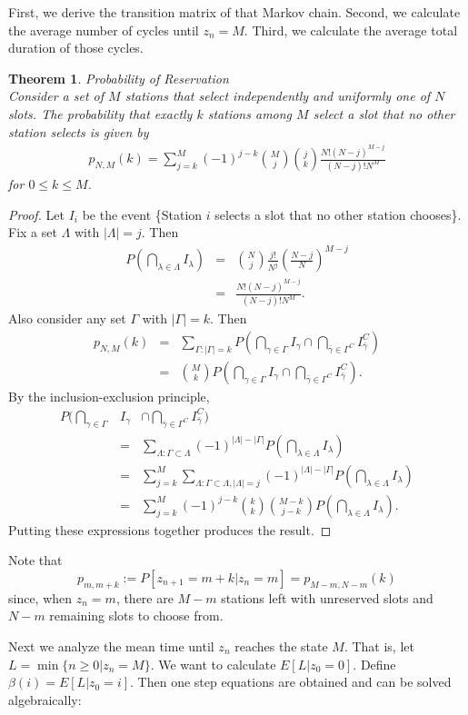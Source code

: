 \documentclass{acm_proc_article-sp}
\newtheorem{theorem}{Theorem}
\newcommand{\be}{\begin{eqnarray}}
\newcommand{\ee}{\end{eqnarray}}
\newcommand{\sub}{}
\begin{document}
First, we derive the transition matrix of that Markov chain. Second, we calculate the average number of cycles until $z_n = M$. Third, we calculate the average total duration of those cycles.

\begin{theorem}{Probability of Reservation}\\
Consider a set of $M$ stations that select independently and uniformly one of $N$ slots.  The probability that exactly $k$ stations among $M$ select a slot that
no other station selects is given by
\be p_{N, M}(k) = \sum_{j=k}^{M}(-1)^{j-k}{M \choose j}{j \choose k}\frac{N!(N-j)^{M-j}}{(N-j)!N^M} \ee
for $0 \leq k \leq M$.
\end{theorem}
\begin{proof}
Let $I_{i}$ be the event \{Station $i$ selects a slot that no other station chooses\}. Fix a set $\Lambda$ with $|\Lambda| = j$. Then
\be
    P(\bigcap_{\lambda \in \Lambda}I_{\lambda})
    &=& {N \choose j}\frac{j!}{N^j}\left(\frac{N-j}{N}\right)^{M-j}\\
    &=& \frac{N!(N-j)^{M-j}}{(N-j)!N^M}.\sub
\ee
Also consider any set $\Gamma$ with $|\Gamma|=k$. Then
\be
    p_{N, M}(k)
    &=& \sum_{\Gamma : |\Gamma| = k } P(\bigcap_{\gamma \in \Gamma}I_{\gamma} \cap \bigcap_{\bar{\gamma} \in \Gamma^C }I_{\bar{\gamma}}^C) \\
    &=& {M \choose k} P(\bigcap_{\gamma \in \Gamma}I_{\gamma} \cap \bigcap_{\bar{\gamma} \in \Gamma^C }I_{\bar{\gamma}}^C).\sub
\ee
By the inclusion-exclusion principle,
\be
    P(\bigcap_{\gamma \in \Gamma}&I_{\gamma}& \cap \bigcap_{\bar{\gamma} \in \Gamma^C }I_{\bar{\gamma}}^C)\nonumber\\
    &=& \sum_{\Lambda: \Gamma \subset \Lambda} (-1)^{|\Lambda|-|\Gamma|} P(\bigcap_{\lambda \in \Lambda} I_{\lambda})\\
    &=& \sum_{j=k}^{M} \sum_{\Lambda: \Gamma \subset \Lambda, |\Lambda| = j} (-1)^{|\Lambda|-|\Gamma|} P(\bigcap_{\lambda \in \Lambda} I_{\lambda})\\
    &=& \sum_{j=k}^{M} (-1)^{j-k} {k \choose k} {M-k \choose j-k} P(\bigcap_{\lambda \in \Lambda} I_{\lambda}).\sub
\ee
Putting these expressions together produces the result.
\end{proof}

Note that
\[
p_{m, m + k} := P[z_{n+1} = m + k | z_n = m] = p_{M - m, N - m} (k)
\]
since, when $z_n = m$, there are $M - m$ stations left with unreserved slots and $N - m$ remaining slots to choose from.

Next we analyze the mean time until $z_n$ reaches the state $M$.  That is, let $L = \min \{n \geq 0 | z_n = M\}$.  We want to calculate $E[L|z_0 = 0]$.
Define $\beta (i) = E[L | z_0 = i]$.  Then one step equations are obtained and can be solved algebraically:
\end{document}
